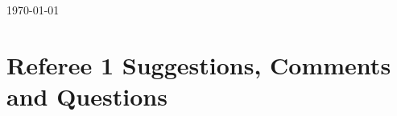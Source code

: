 \documentclass[11pt,english]{article}
\begin{document}


\makeatletter
{\def\@currentlabel{1}\label{introduction}}
{\def\@currentlabel{2}\label{institutions}}
{\def\@currentlabel{3}\label{identification}}
{\def\@currentlabel{1}\label{eq:main}}
{\def\@currentlabel{4}\label{results}}
{\def\@currentlabel{4.1}\label{main_results}}
{\def\@currentlabel{4.2}\label{sec:spillovers}}
{\def\@currentlabel{4.3}\label{heterogeneity}}
{\def\@currentlabel{4.4}\label{mechanisms}}
{\def\@currentlabel{5}\label{conclusions}}
{\def\@currentlabel{A}\label{sec:appendixA}}
{\def\@currentlabel{B}\label{sec:appendixB}}
{\def\@currentlabel{B.4}\label{resources_plan_cuadrante}}
{\def\@currentlabel{C}\label{sec:appendixC}}
{\def\@currentlabel{C.4}\label{sec:admin_uncapped}}
{\def\@currentlabel{C.5}\label{sec:bonferroni}}
{\def\@currentlabel{C.8}\label{sec:earthquake}}
\makeatother

\doublespacing
\begin{flushright}
\today \\[24pt]
\end{flushright}
\setcounter{Ref}{1}
\setcounter{RefComment}{0}
\setcounter{table}{0}
\setcounter{figure}{0}
\section*{Referee 1 Suggestions, Comments and Questions}

\FloatBarrier
\end{document}
